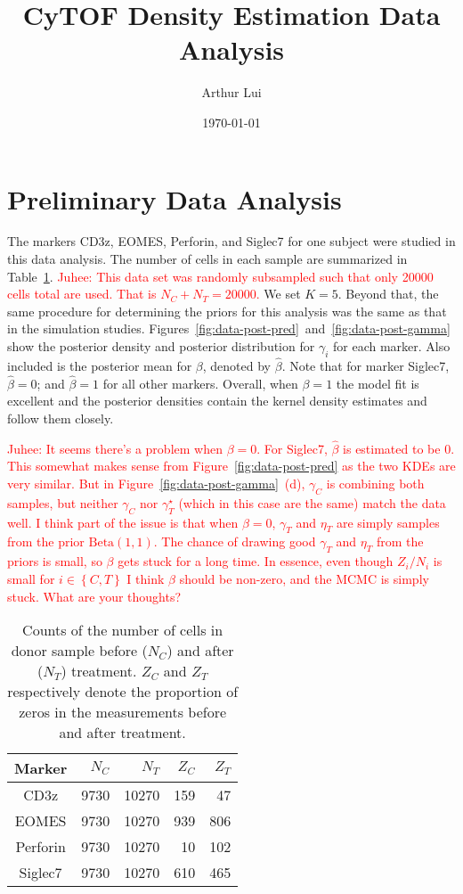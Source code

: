 \documentclass[12pt]{article} %
\title{CyTOF Density Estimation Data Analysis}
\author{Arthur Lui}
\date{\today} %
\newcommand{\bc}[1]{ \left\{#1\right\} }
\newcommand{\Beta}{\text{Beta}}
\newcommand{\alert}[1]{\textcolor{red}{#1}}
\begin{document}
\maketitle

\section{Preliminary Data Analysis}
The markers CD3z, EOMES, Perforin, and Siglec7 for one subject were studied
in this data analysis. The number of cells in each sample are summarized in 
Table~\ref{tab:data-counts}.
%
\alert{Juhee: This data set was randomly subsampled such that only 20000
cells total are used. That is $N_C + N_T = 20000$.}
%
We set $K=5$. Beyond that, the same procedure for determining the priors for
this analysis was the same as that in the simulation studies.
Figures~\ref{fig:data-post-pred}~and~\ref{fig:data-post-gamma} show the posterior
density and posterior distribution for $\gamma_i$ for each marker. Also
included is the posterior mean for $\beta$, denoted by $\hat\beta$. Note that
for marker Siglec7, $\hat\beta=0$; and $\hat\beta=1$ for all other markers.
Overall, when $\beta=1$ the model fit is excellent and the posterior densities
contain the kernel density estimates and follow them closely.

\alert{Juhee: It seems there's a problem when $\beta=0$. For Siglec7,
$\hat\beta$ is estimated to be 0. This somewhat makes sense from
Figure~\ref{fig:data-post-pred} as the two KDEs are very similar. But in
Figure~\ref{fig:data-post-gamma}~(d), $\gamma_C$ is combining both samples,
but neither $\gamma_C$ nor $\gamma_T^\star$ (which in this case are the same)
match the data well. I think part of the issue is that when $\beta=0$,
$\gamma_T$ and $\eta_T$ are simply samples from the prior $\Beta(1,1)$. The
chance of drawing good $\gamma_T$ and $\eta_T$ from the priors is small, so
$\beta$ gets stuck for a long time. In essence, even though $Z_i/N_i$ is
small for $i\in\bc{C,T}$ I think $\hat\beta$ should be non-zero, and the MCMC
is simply stuck. What are your thoughts?}

\begin{table}[!t]
  \centering
  \begin{tabular}{|c|rrrr|}
    \hline
    Marker   & $N_C$ & $N_T$ & $Z_C$ & $Z_T$ \\ 
    \hline
    CD3z       & 9730 & 10270 & 159 &  47 \\ 
    EOMES      & 9730 & 10270 & 939 & 806 \\ 
    Perforin   & 9730 & 10270 &  10 & 102 \\ 
    Siglec7    & 9730 & 10270 & 610 & 465 \\ 
    \hline
  \end{tabular} 
  \caption{Counts of the number of cells in donor sample before ($N_C$) and
  after ($N_T$) treatment. $Z_C$ and $Z_T$ respectively denote the proportion
  of zeros in the measurements before and after treatment.}
  \label{tab:data-counts}
\end{table}
\end{document}
